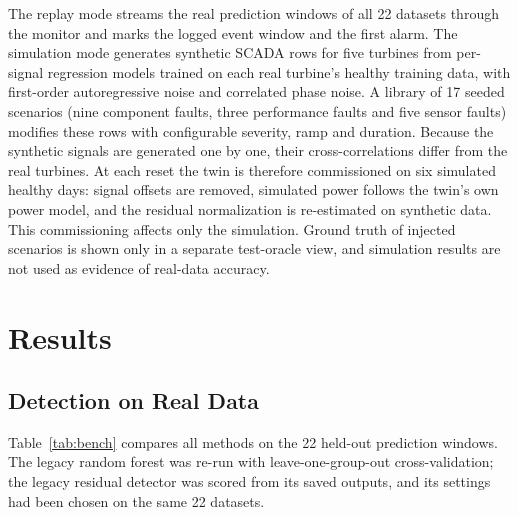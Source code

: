 \documentclass[conference]{IEEEtran}
\begin{document}
The replay mode streams the real prediction windows of all 22 datasets through the monitor and marks the logged event window and the first alarm. The simulation mode generates synthetic SCADA rows for five turbines from per-signal regression models trained on each real turbine's healthy training data, with first-order autoregressive noise and correlated phase noise. A library of 17 seeded scenarios (nine component faults, three performance faults and five sensor faults) modifies these rows with configurable severity, ramp and duration. Because the synthetic signals are generated one by one, their cross-correlations differ from the real turbines. At each reset the twin is therefore commissioned on six simulated healthy days: signal offsets are removed, simulated power follows the twin's own power model, and the residual normalization is re-estimated on synthetic data. This commissioning affects only the simulation. Ground truth of injected scenarios is shown only in a separate test-oracle view, and simulation results are not used as evidence of real-data accuracy.

\section{Results}
\subsection{Detection on Real Data}
Table~\ref{tab:bench} compares all methods on the 22 held-out prediction windows. The legacy random forest was re-run with leave-one-group-out cross-validation; the legacy residual detector was scored from its saved outputs, and its settings had been chosen on the same 22 datasets.
\end{document}
